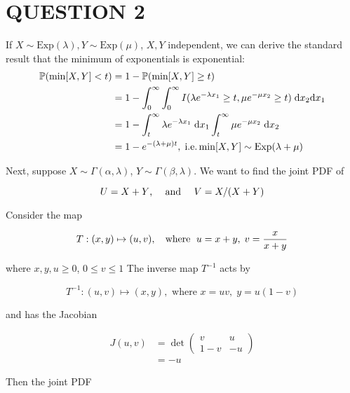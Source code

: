 \documentclass[a4paper]{article}
\begin{document}
	
\maketitle



\section{QUESTION 2}

If $ X \sim \text{Exp}(\lambda), Y \sim \text{Exp}(\mu)  $, $ X,Y $ independent, we can derive the standard result that the minimum of exponentials is exponential:
	\begin{align*}
	\mathbb{P} (\min[X,Y] < t) & =  1 - \mathbb{P} (\min[X,Y] \geq t) \\
	& = 1 - \int_{0}^{\infty} \int_{0}^{\infty} I(\lambda e^{-\lambda x_{1}} \geq t, \mu e^{-\mu x_{2}} \geq t ) \; \mathrm{d} x_{2} \mathrm{d} x_{1} \\
	& = 1 - \int_{t}^{\infty} \lambda e^{-\lambda x_{1}} \; \mathrm{d} x_{1} \int_{t}^{\infty} \mu e^{-\mu x_{2}} \; \mathrm{d} x_{2} \\
	& = 1 - e^{-(\lambda + \mu) t}, \; \text{i.e.} \min[X,Y] \sim \text{Exp}(\lambda + \mu)
	\end{align*}
	
	
 


	Next, suppose $ X \sim \Gamma(\alpha,\lambda) $, $ Y \sim \Gamma(\beta,\lambda)  $. We want to find the joint PDF of
	
	\[ U = X + Y \text{, \quad and \quad } V = X / (X + Y) \]
	
	Consider the map 
	
	\[ T: (x,y) \mapsto (u,v), \text{ \; where \;} u = x + y, \; v = \frac{x}{x + y} \]
	
	where $ x,y,u \geq 0 $, $ 0 \leq v \leq 1 $ The inverse map $ T^{-1} $ acts by
	
	\[ T^{-1}: (u,v) \mapsto (x,y), \text{ where } x = uv, \; y = u(1-v) \]
	
	and has the Jacobian
	
	\begin{align*}
	J(u,v) & = \det \begin{pmatrix}
	v & u \\
	1 - v & -u 
	\end{pmatrix}  \\
	& = -u
	\end{align*}
	
	Then the joint PDF
	
\end{document}
